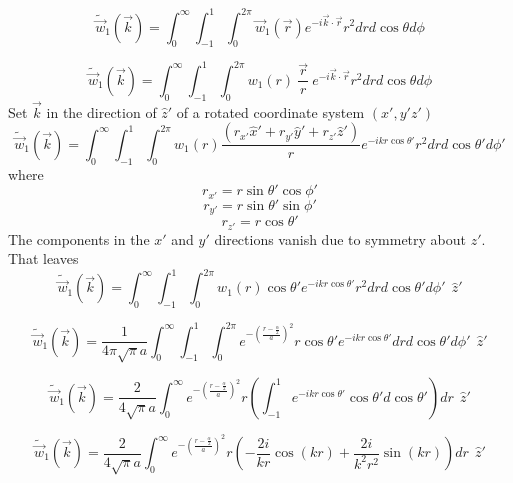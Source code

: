 \documentclass[double,12pt]{beavtex}
\begin{document}
\begin{equation}{\widetilde{\vec{w}}_1(\vec{k})=\int_{0}^{\infty}\int_{-1}^{1}\int_{0}^{2\pi}\vec{w}_1(\vec{r})e^{-i\vec{k}\cdot{\vec{r}}}r^2d{r}d{\cos\theta}d{\phi}}\end{equation}

\begin{equation}{\widetilde{\vec{w}}_1(\vec{k})=\int_{0}^{\infty}\int_{-1}^{1}\int_{0}^{2\pi}w_1(r){~}\frac{\vec{r}}{r}{~}e^{-i\vec{k}\cdot{\vec{r}}}r^2d{r}d{\cos\theta}d{\phi}}\end{equation}
Set $\vec{k}$ in the direction of $\hat{z}'$ of a rotated coordinate system $(x',y'z')$ 
\begin{equation}{\widetilde{\vec{w}}_1(\vec{k})=\int_{0}^{\infty}\int_{-1}^{1}\int_{0}^{2\pi}w_1(r)\frac{(r_{x'}\hat{x}'+r_{y'}\hat{y}'+r_{z'}\hat{z}')}{r}e^{-ikr\cos\theta'}r^2d{r}d{\cos\theta'}d{\phi'}}\end{equation}
where
\begin{displaymath}{r_{x'}=r\sin\theta'\cos\phi'}\end{displaymath}
\begin{displaymath}{r_{y'}=r\sin\theta'\sin\phi'}\end{displaymath}
\begin{displaymath}{r_{z'}=r\cos\theta'}\end{displaymath} 
The components in the $x'$ and $y'$ directions vanish due to symmetry about $z'$. That leaves
\begin{equation}{\widetilde{\vec{w}}_1(\vec{k})=\int_{0}^{\infty}\int_{-1}^{1}\int_{0}^{2\pi}w_1(r)\cos{\theta}'e^{-ikr\cos\theta'}r^2d{r}d{\cos\theta'}d{\phi'}{~~}\hat{z}'}\end{equation}

\begin{equation}{\widetilde{\vec{w}}_1(\vec{k})=\frac{1}{4\pi\sqrt{\pi}a}\int_{0}^{\infty}\int_{-1}^{1}\int_{0}^{2\pi}e^{-\left(\frac{r-\frac{\alpha}{2}}{a}\right)^2}r\cos{\theta}'e^{-ikr\cos\theta'}d{r}d{\cos\theta'}d{\phi'}{~~}\hat{z}'}\end{equation}

\begin{equation}{\widetilde{\vec{w}}_1(\vec{k})=\frac{2}{4\sqrt{\pi}a}\int_{0}^{\infty}e^{-\left(\frac{r-\frac{\alpha}{2}}{a}\right)^2}r\left(\int_{-1}^{1}e^{-ikr\cos\theta'}\cos{\theta}'d{\cos\theta'}\right)d{r}{~~}\hat{z}'}\end{equation}

\begin{equation}{\widetilde{\vec{w}}_1(\vec{k})=\frac{2}{4\sqrt{\pi}a}\int_{0}^{\infty}e^{-\left(\frac{r-\frac{\alpha}{2}}{a}\right)^2}r\left(-\frac{2i}{kr}\cos(kr)+\frac{2i}{k^2r^2}\sin(kr)\right)d{r}{~~}\hat{z}'}\end{equation}
\end{document}
